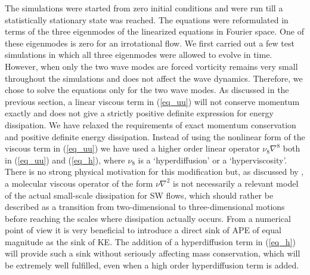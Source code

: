 The simulations were started from zero initial
conditions and were run till a statistically stationary state was reached. The
equations were reformulated in terms of the three eigenmodes of the linearized
equations in Fourier space. One of these eigenmodes is zero for an irrotational
flow. We first carried out a few test simulations in which all three eigenmodes
were allowed to evolve in time. However, when only the two wave modes are
forced vorticity remains very small throughout the simulations and does not
affect the wave dynamics. Therefore, we chose to solve the equations only for
the two wave modes. As discussed in the previous section, a linear viscous term
in (\ref{eq_uu}) will not conserve momentum exactly and does not give a
strictly positive definite expression for energy dissipation. We have relaxed
the requirements of exact momentum conservation and positive definite energy
dissipation. Instead of using the nonlinear form of the viscous term in
(\ref{eq_uu}) we have used a higher order linear operator $ \nu_8 \nabla^{8} $
both in (\ref{eq_uu}) and (\ref{eq_h}), where $ \nu_8 $ is a `hyperdiffusion'
or a `hyperviscosity'. There is no strong physical motivation for this
modification but, as discussed by \cite{FargeSadourny1989}, a molecular viscous
operator of the form $\nu \nabla^2 $ is not necessarily a relevant model of the
actual small-scale dissipation for SW flows, which should rather be described
as a transition from two-dimensional to three-dimensional motions before
reaching the scales where dissipation actually occurs.
From a numerical point of view it is very beneficial to introduce a direct sink of APE of equal magnitude as the sink of KE.
The addition of a hyperdiffusion term in (\ref{eq_h}) will provide such a sink without seriously affecting mass conservation, which will be 
extremely well fulfilled, even when a high order hyperdiffusion term is added. 

